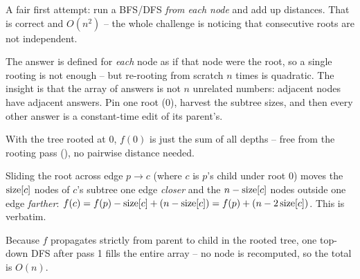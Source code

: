 \begin{attemptgate}
A fair first attempt: run a BFS/DFS \emph{from each node} and add up distances. That is
correct and $O(n^2)$ -- the whole challenge is noticing that consecutive roots are not
independent.
\end{attemptgate}

The answer is defined for \emph{each} node as if that node were the root, so a single
rooting is not enough -- but re-rooting from scratch $n$ times is quadratic. The insight is
that the array of answers is not $n$ unrelated numbers: adjacent nodes have adjacent
answers. Pin one root ($0$), harvest the subtree sizes, and then every other answer is a
constant-time edit of its parent's.

\begin{observation}
With the tree rooted at $0$, $f(0)$ is just the sum of all depths -- free from the rooting
pass (), no pairwise distance needed.
\end{observation}
\begin{observation}
Sliding the root across edge $p\!\to\!c$ (where $c$ is $p$'s child under root $0$) moves the
$\operatorname{size}[c]$ nodes of $c$'s subtree one edge \emph{closer} and the $n-\operatorname{size}[c]$ nodes outside
one edge \emph{farther}: $f(c)=f(p)-\operatorname{size}[c]+(n-\operatorname{size}[c])=f(p)+(n-2\operatorname{size}[c])$. This is
 verbatim.
\end{observation}
\begin{observation}
Because $f$ propagates strictly from parent to child in the rooted tree, one top-down DFS
after pass 1 fills the entire array -- no node is recomputed, so the total is $O(n)$.
\end{observation}

